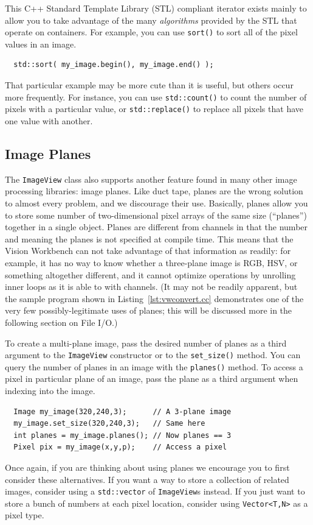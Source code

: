 This C++ Standard Template Library (STL) compliant iterator exists
mainly to allow you to take advantage of the many {\it algorithms}
provided by the STL that operate on containers.  For example, you can
use \verb#sort()# to sort all of the pixel values in an image.
\begin{verbatim}
  std::sort( my_image.begin(), my_image.end() );
\end{verbatim}
That particular example may be more cute than it is useful, but others
occur more frequently.  For instance, you can use \verb#std::count()#
to count the number of pixels with a particular value, or
\verb#std::replace()# to replace all pixels that have one value with
another.

\subsection{Image Planes}

The \verb#ImageView# class also supports another feature found in many
other image processing libraries: image planes.  Like duct tape,
planes are the wrong solution to almost every problem, and we
discourage their use.  Basically, planes allow you to store some
number of two-dimensional pixel arrays of the same size (``planes'')
together in a single object.  Planes are different from channels in
that the number and meaning the planes is not specified at compile
time.  This means that the Vision Workbench can not take advantage of
that information as readily: for example, it has no way to know
whether a three-plane image is RGB, HSV, or something altogether
different, and it cannot optimize operations by unrolling inner loops
as it is able to with channels.  (It may not be readily apparent, but
the sample program shown in Listing~\ref{lst:vwconvert.cc}
demonstrates one of the very few possibly-legitimate uses of planes;
this will be discussed more in the following section on File I/O.)

To create a multi-plane image, pass the desired number of planes as a
third argument to the \verb#ImageView# constructor or to the
\verb#set_size()# method.  You can query the number of planes in an
image with the \verb#planes()# method.  To access a pixel in particular
plane of an image, pass the plane as a third argument when indexing
into the image.
\begin{verbatim}
  Image my_image(320,240,3);      // A 3-plane image
  my_image.set_size(320,240,3);   // Same here
  int planes = my_image.planes(); // Now planes == 3
  Pixel pix = my_image(x,y,p);    // Access a pixel
\end{verbatim}
Once again, if you are thinking about using planes we encourage you to
first consider these alternatives.  If you want a way to store a
collection of related images, consider using a \verb#std::vector# of
\verb#ImageView#s instead.  If you just want to store a bunch of
numbers at each pixel location, consider using \verb#Vector<T,N># as a
pixel type.

